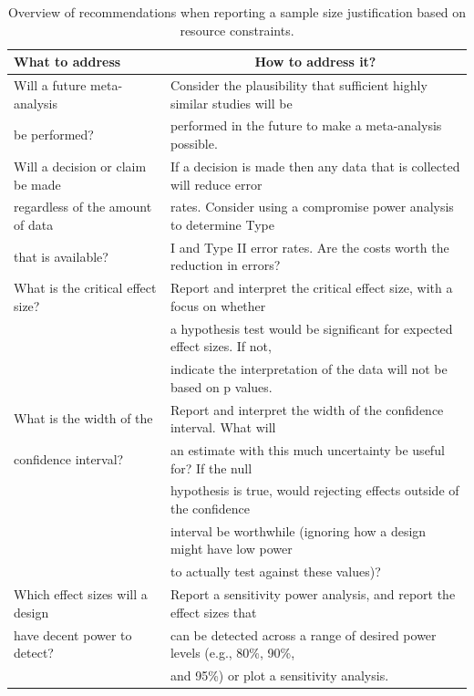 \documentclass[
  english,
  ,jou, a4paper,floatsintext]{apa6}
\begin{document}
\begin{table}[tbp]

\begin{center}
\begin{threeparttable}

\caption{\label{tab:table-pow-rec}Overview of recommendations when reporting a sample size justification based on resource constraints.}

\begin{tabular}{ll}
\toprule
What to address & \multicolumn{1}{c}{How to address it?}\\
\midrule
Will a future meta-analysis & Consider the plausibility that sufficient highly similar studies will be\\
be performed? & performed in the future to make a meta-analysis possible.\\ \midrule
Will a decision or claim be made & If a decision is made then any data that is collected will reduce error\\
regardless of the amount of data & rates. Consider using a compromise power analysis to determine Type\\
that is available? & I and Type II error rates. Are the costs worth the reduction in errors?\\ \midrule
What is the critical effect size? & Report and interpret the critical effect size, with a focus on whether\\
 & a hypothesis test would be significant for expected effect sizes. If not,\\
 & indicate the interpretation of the data will not be based on p values.\\ \midrule
What is the width of the & Report and interpret the width of the confidence interval. What will\\
confidence interval? & an estimate with this much uncertainty be useful for? If the null\\
 & hypothesis is true, would rejecting effects outside of the confidence\\
 & interval be worthwhile (ignoring how a design might have low power\\
 & to actually test against these values)?\\ \midrule
Which effect sizes will a design & Report a sensitivity power analysis, and report the effect sizes that\\
have decent power to detect? & can be detected across a range of desired power levels (e.g., 80\%, 90\%,\\
 & and 95\%) or plot a sensitivity analysis.\\
\bottomrule
\end{tabular}

\end{threeparttable}
\end{center}

\end{table}
\end{document}
